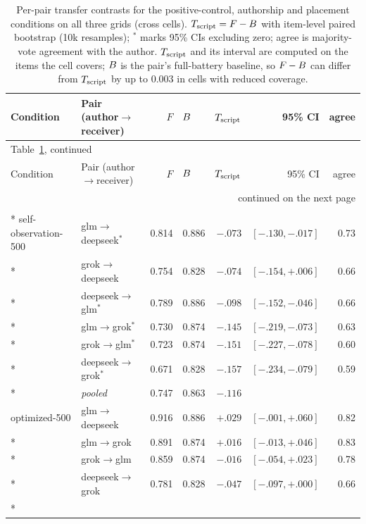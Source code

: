 {\scriptsize\renewcommand{\arraystretch}{0.9}
\begin{longtable}{llrlrrr}
\caption{Per-pair transfer contrasts for the positive-control, authorship and placement conditions on all three grids (cross cells). $T_{\mathrm{script}} = F - B$ with item-level paired bootstrap (10k resamples); $^{*}$ marks 95\% CIs excluding zero; agree is majority-vote agreement with the author. $T_{\mathrm{script}}$ and its interval are computed on the items the cell covers; $B$ is the pair's full-battery baseline, so $F - B$ can differ from $T_{\mathrm{script}}$ by up to $0.003$ in cells with reduced coverage.}\label{tab:control-pairs} \\
\toprule
Condition & Pair (author$\to$receiver) & $F$ & $B$ & $T_{\mathrm{script}}$ & 95\% CI & agree \\
\midrule
\endfirsthead
\multicolumn{7}{l}{\footnotesize Table~\ref{tab:control-pairs}, continued} \\
\toprule
Condition & Pair (author$\to$receiver) & $F$ & $B$ & $T_{\mathrm{script}}$ & 95\% CI & agree \\
\midrule
\endhead
\midrule
\multicolumn{7}{r}{\footnotesize continued on the next page} \\
\endfoot
\bottomrule
\endlastfoot
\multicolumn{7}{l}{\emph{Grid A}} \\*
self-observation-500 & glm$\to$deepseek$^{*}$ & 0.814 & 0.886 & $-.073$ & $[-.130,-.017]$ & 0.73 \\*
 & grok$\to$deepseek & 0.754 & 0.828 & $-.074$ & $[-.154,+.006]$ & 0.66 \\*
 & deepseek$\to$glm$^{*}$ & 0.789 & 0.886 & $-.098$ & $[-.152,-.046]$ & 0.66 \\*
 & glm$\to$grok$^{*}$ & 0.730 & 0.874 & $-.145$ & $[-.219,-.073]$ & 0.63 \\*
 & grok$\to$glm$^{*}$ & 0.723 & 0.874 & $-.151$ & $[-.227,-.078]$ & 0.60 \\*
 & deepseek$\to$grok$^{*}$ & 0.671 & 0.828 & $-.157$ & $[-.234,-.079]$ & 0.59 \\*
 & \emph{pooled} & 0.747 & 0.863 & $-.116$ & & \\
\addlinespace
optimized-500 & glm$\to$deepseek & 0.916 & 0.886 & $+.029$ & $[-.001,+.060]$ & 0.82 \\*
 & glm$\to$grok & 0.891 & 0.874 & $+.016$ & $[-.013,+.046]$ & 0.83 \\*
 & grok$\to$glm & 0.859 & 0.874 & $-.016$ & $[-.054,+.023]$ & 0.78 \\*
 & deepseek$\to$grok & 0.781 & 0.828 & $-.047$ & $[-.097,+.000]$ & 0.66 \\*

\end{longtable}}
